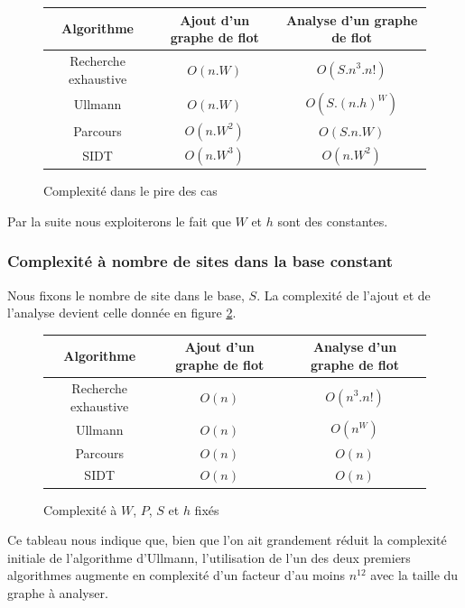 \begin{figure}[h]
\begin{center}
\begin{tabular}{|c|c|c|}
 \hline
 Algorithme & Ajout d'un graphe de flot & Analyse d'un graphe de flot\\
 \hline
 Recherche exhaustive & $O(n.W)$ & $O(S.n^3.n!)$\\
 Ullmann & $O(n.W)$ & $O(S.(n.h)^W)$ \\
 Parcours & $O(n.W^2)$ & $O(S.n.W)$\\
 SIDT & $O(n.W^3)$ & $O(n.W^2)$\\
 \hline
\end{tabular} 
\end{center}
\caption{Complexité dans le pire des cas}
\label{fig:complexite_1}
\end{figure}

\FloatBarrier
Par la suite nous exploiterons le fait que $W$ et $h$ sont des constantes.

\subsubsection{Complexité à nombre de sites dans la base constant}
Nous fixons le nombre de site dans le base, $S$.
La complexité de l'ajout et de l'analyse devient celle donnée en figure \ref{fig:complexite_2}.

\begin{figure}[h]
\begin{center}
\begin{tabular}{|c|c|c|}
 \hline
 Algorithme & Ajout d'un graphe de flot & Analyse d'un graphe de flot\\
 \hline
 Recherche exhaustive & $O(n)$ & $O(n^3.n!)$\\
 Ullmann & $O(n)$ & $O(n^W)$ \\
 Parcours & $O(n)$ & $O(n)$\\
 SIDT & $O(n)$ & $O(n)$\\
 \hline
\end{tabular} 
\end{center}
\caption{Complexité à $W$, $P$, $S$ et $h$ fixés}
\label{fig:complexite_2}
\end{figure}

Ce tableau nous indique que, bien que l'on ait grandement réduit la complexité initiale de l'algorithme d'Ullmann, l'utilisation de l'un des deux premiers algorithmes augmente en complexité d'un facteur d'au moins $n^{12}$ avec la taille du graphe à analyser.

